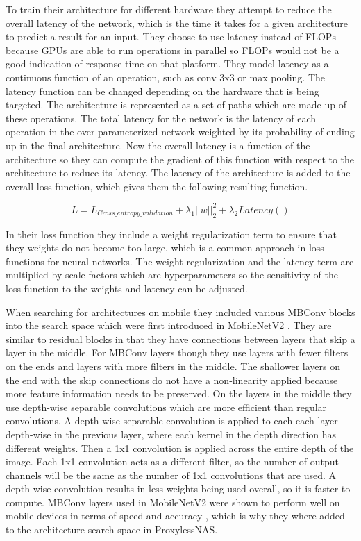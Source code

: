 \documentclass{ieee}
\begin{document}
To train their architecture for different hardware they attempt to reduce the overall latency of the network, which is the time it takes for a given architecture to predict a result for an input. They choose to use latency instead of FLOPs because GPUs are able to run operations in parallel so FLOPs would not be a good indication of response time on that platform. They model latency as a continuous function of an operation, such as conv 3x3 or max pooling. The latency function can be changed depending on the hardware that is being targeted. The architecture is represented as a set of paths which are made up of these operations. The total latency for the network is the latency of each operation in the over-parameterized network weighted by its probability of ending up in the final architecture. Now the overall latency is a function of the architecture so they can compute the gradient of this function with respect to the architecture to reduce its latency. The latency of the architecture is added to the overall loss function, which gives them the following resulting function. 

\begin{equation}
    L = L_{Cross\_entropy\_validation} + \lambda_1 ||w||_2^2 + \lambda_2Latency()
\end{equation}

In their loss function they include a weight regularization term to ensure that they weights do not become too large, which is a common approach in loss functions for neural networks. The weight regularization and the latency term are multiplied by scale factors which are hyperparameters so the sensitivity of the loss function to the weights and latency can be adjusted.

When searching for architectures on mobile they included various MBConv blocks into the search space which were first introduced in MobileNetV2 \cite{sandler_howard_zhu_zhmoginov_chen_2018}. They are similar to residual blocks in that they have connections between layers that skip a layer in the middle. For MBConv layers though they use layers with fewer filters on the ends and layers with more filters in the middle. The shallower layers on the end with the skip connections do not have a non-linearity applied because more feature information needs to be preserved. On the layers in the middle they use depth-wise separable convolutions which are more efficient than regular convolutions. A depth-wise separable convolution is applied to each each layer depth-wise in the previous layer, where each kernel in the depth direction has different weights. Then a 1x1 convolution is applied across the entire depth of the image. Each 1x1 convolution acts as a different filter, so the number of output channels will be the same as the number of 1x1 convolutions that are used. A depth-wise convolution results in less weights being used overall, so it is faster to compute. \cite{separable_convolutions_2018} MBConv layers used in MobileNetV2 were shown to perform well on mobile devices in terms of speed and accuracy \cite{sandler_howard_zhu_zhmoginov_chen_2018}, which is why they where added to the architecture search space in ProxylessNAS.
\end{document}
